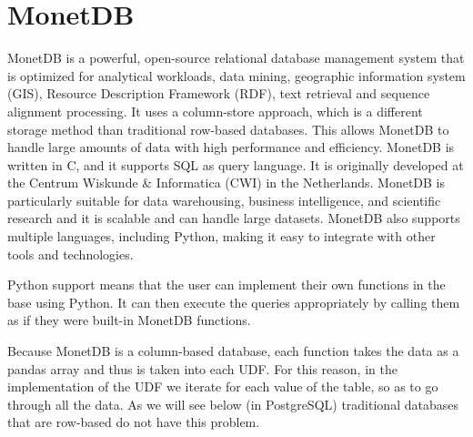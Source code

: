 \section{MonetDB}
\label{sec:monet}


MonetDB is a powerful, open-source relational database management system that is optimized for analytical workloads, data mining, 
geographic information system (GIS), Resource Description Framework (RDF), text retrieval and sequence alignment processing. 
It uses a column-store approach, which is a different storage method than traditional row-based databases. 
This allows MonetDB to handle large amounts of data with high performance and efficiency. 
MonetDB is written in C, and it supports SQL as query language. It is originally developed at the Centrum Wiskunde & Informatica (CWI) in the Netherlands.
MonetDB is particularly suitable for data warehousing, business intelligence, and scientific research and it is scalable and can handle large datasets. 
MonetDB also supports multiple languages, including Python, making it easy to integrate with other tools and technologies.

Python support means that the user can implement their own functions in the base using Python. 
It can then execute the queries appropriately by calling them as if they were built-in MonetDB functions.

Because MonetDB is a column-based database, each function takes the data as a pandas array and thus is taken into each UDF. For this reason, in the implementation of the UDF we iterate for each value of the table, so as to go through all the data. As we will see below (in PostgreSQL) traditional databases that are row-based do not have this problem.